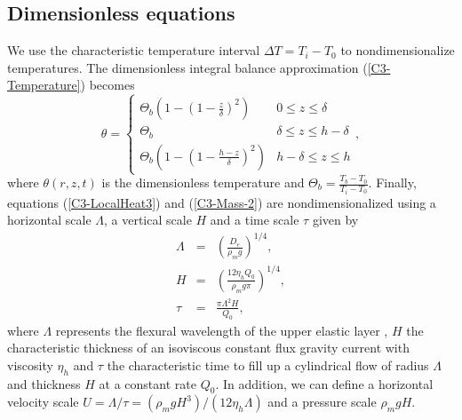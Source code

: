 \subsection{Dimensionless equations}
\label{C3-sec:dimens-equat}

We use the characteristic temperature interval $\Delta T = T_i-T_0$ to
nondimensionalize  temperatures.  The  dimensionless integral  balance
approximation (\ref{C3-Temperature}) becomes
\begin{equation}
  \theta=
  \begin{cases}
    \Theta_b\left(1 -(1-\frac{z}{\delta})^2\right)& 0 \le z\le \delta \\
    \Theta_b & \delta \le z\le h-\delta \\
    \Theta_b\left(1-(1-\frac{h-z}{\delta})^2\right)  &   h-\delta  \le
    z\le h
  \end{cases},
  \label{C3-Temperature2}
\end{equation}
where   $\theta(r,z,t)$   is   the   dimensionless   temperature   and
$\Theta_b=\frac{T_b-T_0}{T_{i}-T_0}$.         Finally,       equations
(\ref{C3-LocalHeat3})  and  (\ref{C3-Mass-2})  are  nondimensionalized
using a  horizontal scale $\Lambda$, a  vertical scale $H$ and  a time
scale $\tau$ given by
\begin{eqnarray}
  \Lambda &=& \left(\frac{D_e}{\rho_m g}\right)^{1/4}\label{C3-L1},\\
  H&=&\left       (\frac{12\eta_h      Q_{0}}{\rho_{m}g       \pi}\right      )
       ^{1/4} \label{C3-H1},\\
  \tau&=&\frac{\pi \Lambda^{2} H}{Q_{0}}\label{C3-T1},
\end{eqnarray}
where  $\Lambda$  represents  the  flexural wavelength  of  the  upper
elastic layer \citep{Michaut:2011kg}, $H$ the characteristic thickness
of an isoviscous constant flux gravity current with viscosity $\eta_h$
\citep{Huppert:1982wr} and $\tau$ the characteristic time to fill up a
cylindrical flow of  radius $\Lambda$ and thickness $H$  at a constant
rate $Q_0$.   In addition, we  can define a horizontal  velocity scale
$U=\Lambda/\tau=\left(\rho_m           g           H^3\right)/\left(12
  \eta_h\Lambda\right)$ and a pressure scale $\rho_m g H$.

